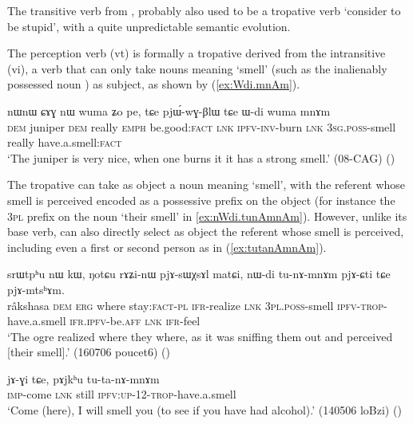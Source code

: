  The transitive verb  from , probably also used to be a tropative verb `consider to be stupid', with a quite unpredictable semantic evolution.

The perception verb  (vt) is formally a tropative derived from the intransitive  (vi), a verb that can only take nouns meaning `smell' (such as the inalienably possessed noun ) as subject, as shown by (\ref{ex:Wdi.mnAm}).

\begin{exe}
\ex \label{ex:Wdi.mnAm}
\gll nɯnɯ ɕɤɣ nɯ wuma ʑo pe, tɕe pjɯ́-wɣ-βlɯ tɕe ɯ-di wuma mnɤm \\
\textsc{dem} juniper \textsc{dem} really \textsc{emph} be.good:\textsc{fact} \textsc{lnk} \textsc{ipfv}-\textsc{inv}-burn \textsc{lnk} \textsc{3sg}.\textsc{poss}-smell really have.a.smell:\textsc{fact} \\
\glt `The juniper is very nice, when one burns it it has a strong smell.' (08-CAG)
()
\end{exe}

The tropative  can take as object a noun meaning `smell', with the referent whose smell is perceived encoded as a possessive prefix on the object (for instance the \textsc{3pl} prefix on the noun  `their smell' in \ref{ex:nWdi.tunAmnAm}). However, unlike its base verb,  can also directly select as object the referent whose smell is perceived, including even a first or second person as in (\ref{ex:tutanAmnAm}).

\begin{exe}
\ex \label{ex:nWdi.tunAmnAm}
\gll srɯtpʰu nɯ kɯ, ŋotɕu rɤʑi-nɯ pjɤ-sɯχsɤl matɕi, nɯ-di tu-nɤ-mnɤm pjɤ-ɕti tɕe pjɤ-mtsʰɤm. \\
râkshasa \textsc{dem} \textsc{erg} where stay:\textsc{fact}-\textsc{pl} \textsc{ifr}-realize \textsc{lnk} \textsc{3pl}.\textsc{poss}-smell \textsc{ipfv}-\textsc{trop}-have.a.smell \textsc{ifr}.\textsc{ipfv}-be.\textsc{aff} \textsc{lnk} \textsc{ifr}-feel \\
\glt `The ogre realized where they where, as it was sniffing them out and perceived [their smell].' (160706 poucet6)
()
\end{exe}


\begin{exe}
\ex \label{ex:tutanAmnAm}
\gll  jɤ-ɣi tɕe, pɤjkʰu tu-ta-nɤ-mnɤm \\
\textsc{imp}-come \textsc{lnk} still \textsc{ipfv}:\textsc{up}-1\fl{}2-\textsc{trop}-have.a.smell \\
\glt `Come (here), I will smell you (to see if you have had alcohol).' (140506 loBzi)
()
\end{exe}

